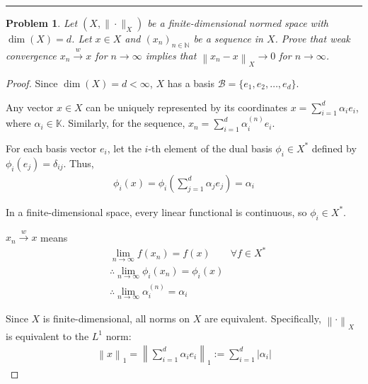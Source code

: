 \documentclass{article}
\newcommand{\norm}[1]{\left\|#1\right\|}
\newtheorem{problem}{Problem}
\begin{document}
\hrule
\vspace{0.5em}


\begin{problem}
    Let $(X, \|\cdot\|_X)$ be a finite-dimensional normed space with $\dim(X)=d$. Let $x \in X$ and $(x_n)_{n\in\mathbb{N}}$ be a sequence in $X$. Prove that weak convergence $x_n \xrightarrow{w} x$ for $n \to \infty$ implies that $\norm{x_n - x}_X \to 0$ for $n \to \infty$.
\end{problem}
\begin{proof}

    Since $\dim(X) = d < \infty$, $X$ has a basis $\mathcal{B} = \{e_1, e_2, \dots, e_d\}$.

    Any vector $x \in X$ can be uniquely represented by its coordinates $x = \sum_{i=1}^d \alpha_i e_i$, where $\alpha_i \in \mathbb{K}$. Similarly, for the sequence, $x_n = \sum_{i=1}^d \alpha_i^{(n)} e_i$.
    
    For each basis vector $e_i$, let the $i$-th element of the dual basis $\phi_i \in X^*$ defined by $\phi_i(e_j) = \delta_{ij}$. Thus,
    \begin{align}
        \phi_i(x) 
        = \phi_i\left(\sum_{j=1}^d \alpha_j e_j\right) 
        = \alpha_i
    \end{align}
    
    In a finite-dimensional space, every linear functional is continuous, so $\phi_i \in X^*$.
    
    $x_n \xrightarrow{w} x$ means
    \begin{align}
        &\lim_{n\to\infty} f(x_n) = f(x) \qquad \forall f \in X^*
        \\
        &\therefore \lim_{n\to\infty} \phi_i(x_n) 
        = \phi_i(x) 
        \\
        &\therefore \lim_{n\to\infty} \alpha_i^{(n)} 
        = \alpha_i
    \end{align}

    
    Since $X$ is finite-dimensional, all norms on $X$ are equivalent. Specifically, $\norm{\cdot}_X$ is equivalent to the $L^1$ norm:
    \begin{align}
        \norm{x}_1 
        = \left\| \sum_{i=1}^d \alpha_i e_i \right\|_1 
        := \sum_{i=1}^d |\alpha_i|
    \end{align}
    

\end{proof}
\end{document}
